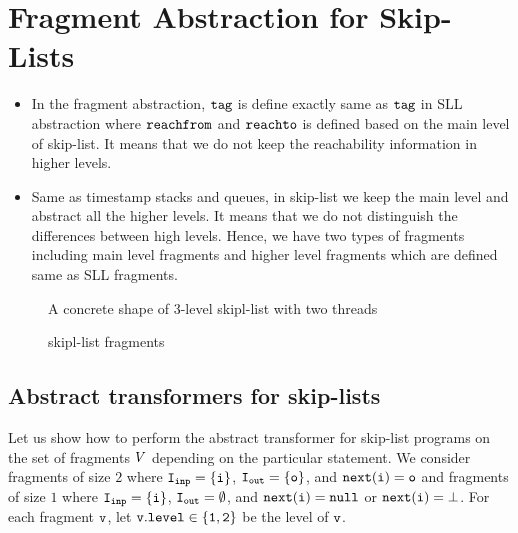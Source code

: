  \section{Fragment Abstraction for  Skip-Lists}
\label{sect:skiplists}

   \begin{itemize}
  \item In the fragment abstraction, $\tt tag$ is define exactly same as $\tt tag$ in SLL abstraction where $\mathtt{reachfrom}$ and $\mathtt{reachto}$ is defined based on the main level of skip-list. It means that we do not keep the reachability information in higher levels.
  \item Same as timestamp stacks and queues, in skip-list we keep the main level and abstract all the higher levels. It means that we do not distinguish the differences between high levels. Hence, we have two types of fragments including main level fragments and higher level fragments which are defined same as SLL fragments. 
   \end{itemize}
 \begin{figure}  
   
 \caption{A concrete shape of 3-level skipl-list with two threads}
\end{figure}

 \begin{figure}  
  
 \caption{skipl-list fragments }
\end{figure}
\subsection{Abstract transformers for skip-lists}
Let us show how to perform the abstract transformer for skip-list programs on the set of fragments $V$ depending on the particular statement.  We consider fragments of size $2$ where $\tt I_{inp} = \{i\}$, $\tt I_{out} = \{{o}\}$, and $\tt next(i) = {o}$ and fragments of size $1$ where $\tt I_{inp} = \{i\}$, $\tt I_{out} = \emptyset$, and $\tt next(i) = null$ or $\tt next(i) = \bot$. For each fragment $\tt v$, let $\tt v.level \in \{1,2\}$ be the level of $\tt v$.

